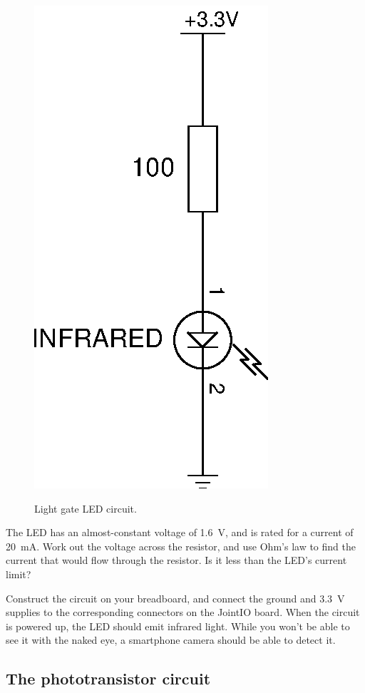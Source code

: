 \documentclass{article}
\begin{document}
\begin{figure}[h]
\centering
\includegraphics[scale=.7]{assets/fig/schem/ir-led}
\label{fig:schem:ir-led}
\caption{Light gate LED circuit.}
\end{figure}

The LED has an almost-constant voltage of \SI{1.6}{\volt}, and is rated for a
current of \SI{20}{\milli\ampere}. Work out the voltage across the resistor,
and use Ohm's law to find the current that would flow through the resistor. Is
it less than the LED's current limit?

Construct the circuit on your breadboard, and connect the ground and
\SI{3.3}{\volt} supplies to the corresponding connectors on the JointIO board.
When the circuit is powered up, the LED should emit infrared light. While you
won't be able to see it with the naked eye, a smartphone camera should be able
to detect it.

\subsection{The phototransistor circuit}
\end{document}
